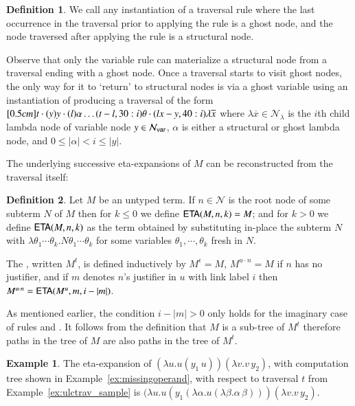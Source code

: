 \documentclass{elsarticle}
\theoremstyle{plain}
\theoremstyle{definition}
\newtheorem{definition}{Definition}[section]
\newtheorem{example}{Example}[section]
\theoremstyle{remark}
\newcommand\Nodes{\mathcal{N}}%
\newcommand\NodesVar{\Nodes_{\sf var}}%
\newcommand\NodesLmd{\Nodes_\lambda}%
\newcommand{\ghostvar}{\theta}
\begin{document}
\begin{definition}
We call  any instantiation of a traversal rule where the last occurrence in the traversal prior to applying the rule is a ghost node, and the node traversed after applying the rule is a structural node.
\end{definition}

Observe that only the variable rule can materialize a structural node from a
traversal ending with a ghost node. Once a traversal starts to visit ghost nodes, the only way for it to `return'  to structural nodes is via a ghost variable using an instantiation of  producing a traversal of the form
$
\Pstr[0.5cm]{ t  \cdot (y){y} \cdot (l){\alpha}  \ldots (t-l,30:i){\ghostvar}
    \cdot (lx-y,40:i){\lambda \overline{x}}}
$
where
 $\lambda \overline{x} \in \NodesLmd$ is the $i$th child lambda node of variable node $y \in \NodesVar$,
$\alpha$ is either a structural or ghost lambda node, and
 $0\leq |\alpha| < i \leq |y|$.


The underlying successive eta-expansions of $M$ can be reconstructed from the traversal itself:
\begin{definition}
\label{def:onthefly_etaexpansion}
Let $M$ be an untyped term. If $n\in \Nodes$ is the root node of some subterm $N$ of $M$ then
for $k \leq 0$ we define ${\sf ETA}(M, n, k) = M$; and for $k> 0$ we define ${\sf ETA}(M, n, k)$ as the term obtained by substituting in-place the subterm $N$ with $\lambda\theta_1 \cdots \theta_k. N \theta_1 \cdots \theta_k$ for some variables $\theta_1, \cdots, \theta_k$ fresh in $N$.

The , written $M^t$, is defined inductively by $M^\epsilon = M$,
$M^{u \cdot n} = M$ if $n$ has no justifier, and if $m$ denotes $n$'s justifier in $u$ with link label $i$ then $M^{u \cdot n} = {\sf ETA}(M^{u}, m, i-|m|)$.
\end{definition}
As mentioned earlier, the condition  $i-|m|>0$ only holds for the imaginary case of rules  and .
It follows from the definition that $M$ is a sub-tree of $M^t$ therefore paths in the tree of $M$ are also paths in the tree of $M^t$.

\begin{example}
The eta-expansion of $(\lambda u . u(y_1\,u)) (\lambda v . v\,y_2)$, with computation tree shown in Example~\ref{ex:missingoperand}, with respect to traversal $t$ from Example~\ref{ex:ulctrav_sample} is
$(\lambda u . u(y_1 (\lambda \alpha. u (\lambda \beta.\alpha\,\beta))) (\lambda v . v\,y_2)$.
\end{example}
\end{document}
